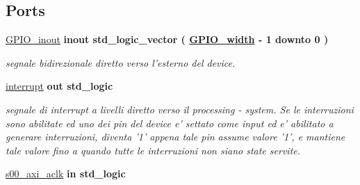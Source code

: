 \subsection*{Ports}
 \begin{DoxyCompactItemize}
\item 
\hypertarget{classmy_g_p_i_o_ga8829699d739ef35a4c5da396ffd38387}{\hyperlink{group___a_x_i-device_ga8829699d739ef35a4c5da396ffd38387}{G\+P\+I\+O\+\_\+inout}  {\bfseries {\bfseries \textcolor{vhdlchar}{inout}\textcolor{vhdlchar}{ }}} {\bfseries \textcolor{vhdlchar}{std\+\_\+logic\+\_\+vector}\textcolor{vhdlchar}{ }\textcolor{vhdlchar}{(}\textcolor{vhdlchar}{ }\textcolor{vhdlchar}{ }\textcolor{vhdlchar}{ }\textcolor{vhdlchar}{ }{\bfseries \hyperlink{group___a_x_i-device_ga0b52ca75e9a6093b2b60d5e851803069}{G\+P\+I\+O\+\_\+width}} \textcolor{vhdlchar}{-\/}\textcolor{vhdlchar}{ } \textcolor{vhdldigit}{1} \textcolor{vhdlchar}{ }\textcolor{vhdlchar}{downto}\textcolor{vhdlchar}{ }\textcolor{vhdlchar}{ } \textcolor{vhdldigit}{0} \textcolor{vhdlchar}{ }\textcolor{vhdlchar}{)}\textcolor{vhdlchar}{ }} }\label{classmy_g_p_i_o_ga8829699d739ef35a4c5da396ffd38387}

\begin{DoxyCompactList}\small\item\em segnale bidirezionale diretto verso l'esterno del device. \end{DoxyCompactList}\item 
\hypertarget{classmy_g_p_i_o_ga5b78f3e3edfaf6e8ec79031b9e631e9d}{\hyperlink{group___a_x_i-device_ga5b78f3e3edfaf6e8ec79031b9e631e9d}{interrupt}  {\bfseries {\bfseries \textcolor{vhdlchar}{out}\textcolor{vhdlchar}{ }}} {\bfseries \textcolor{vhdlchar}{std\+\_\+logic}\textcolor{vhdlchar}{ }} }\label{classmy_g_p_i_o_ga5b78f3e3edfaf6e8ec79031b9e631e9d}

\begin{DoxyCompactList}\small\item\em segnale di interrupt a livelli diretto verso il processing -\/ system. Se le interruzioni sono abilitate ed uno dei pin del device e' settato come input ed e' abilitato a generare interruzioni, diventa '1' appena tale pin assume valore '1', e mantiene tale valore fino a quando tutte le interruzioni non siano state servite. \end{DoxyCompactList}\item 
\hypertarget{classmy_g_p_i_o_ga037f9e3df8559bfd59db37bcba9cb7a8}{\hyperlink{group___a_x_i-device_ga037f9e3df8559bfd59db37bcba9cb7a8}{s00\+\_\+axi\+\_\+aclk}  {\bfseries {\bfseries \textcolor{vhdlchar}{in}\textcolor{vhdlchar}{ }}} {\bfseries \textcolor{vhdlchar}{std\+\_\+logic}\textcolor{vhdlchar}{ }} }\label{classmy_g_p_i_o_ga037f9e3df8559bfd59db37bcba9cb7a8}


\end{DoxyCompactItemize}

